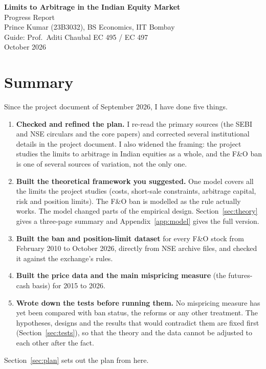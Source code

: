 \documentclass[11pt,a4paper]{article}
\begin{document}
\begin{center}
{\Large\bfseries\color{accent} Limits to Arbitrage in the Indian Equity Market}\\[4pt]
{\large Progress Report}\\[8pt]
Prince Kumar (23B3032), BS Economics, IIT Bombay\\
Guide: Prof.\ Aditi Chaubal \quad\textbar\quad EC 495 / EC 497\\
October 2026
\end{center}
\vspace{4pt}

\section{Summary}
Since the project document of September 2026, I have done five things.

\begin{enumerate}
\item \textbf{Checked and refined the plan.} I re-read the primary sources (the SEBI and NSE circulars and the core papers) and
corrected several institutional details in the project document. I also widened the framing: the project studies the limits
to arbitrage in Indian equities as a whole, and the F\&O ban is one of several sources of variation, not the only one.
\item \textbf{Built the theoretical framework you suggested.} One model covers all the limits the project studies (costs,
short-sale constraints, arbitrage capital, risk and position limits). The F\&O ban is modelled as the rule actually works.
The model changed parts of the empirical design. Section~\ref{sec:theory} gives a three-page summary and
Appendix~\ref{app:model} gives the full version.
\item \textbf{Built the ban and position-limit dataset} for every F\&O stock from February 2010 to October 2026, directly
from NSE archive files, and checked it against the exchange's rules.
\item \textbf{Built the price data and the main mispricing measure} (the futures-cash basis) for 2015 to 2026.
\item \textbf{Wrote down the tests before running them.} No mispricing measure has yet been compared with ban status, the
reforms or any other treatment. The hypotheses, designs and the results that would contradict them are fixed first
(Section~\ref{sec:tests}), so that the theory and the data cannot be adjusted to each other after the fact.
\end{enumerate}
Section~\ref{sec:plan} sets out the plan from here.
\end{document}
